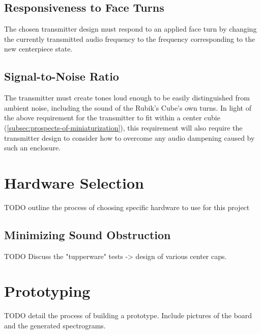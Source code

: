 \subsection{Responsiveness to Face Turns}
\label{subsec:responsiveness-to-face-turns}
The chosen transmitter design must respond to an applied face turn by changing the currently transmitted audio frequency to the frequency corresponding to the new centerpiece state.

\subsection{Signal-to-Noise Ratio}
\label{subsec:transmitter-signal-to-noise-ratio}
The transmitter must create tones loud enough to be easily distinguished from ambient noise, including the sound of the Rubik's Cube's own turns.
In light of the above requirement for the transmitter to fit within a center cubie (\ref{subsec:prospects-of-miniaturization}), this requirement will also require the transmitter design to consider how to overcome any audio dampening caused by such an enclosure.


\section{Hardware Selection}

TODO outline the process of choosing specific hardware to use for this project

\subsection{Minimizing Sound Obstruction}
TODO Discuss the "tupperware" tests -> design of various center caps.


\section{Prototyping}

TODO detail the process of building a prototype. Include pictures of the board and the generated spectrograms.
